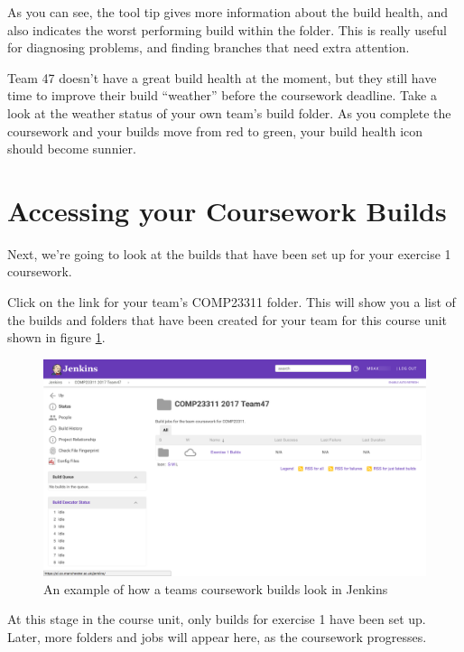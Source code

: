 \documentclass[
]{book}
\begin{document}
As you can see, the tool tip gives more information about the build health, and also indicates the worst performing build within the folder. This is really useful for diagnosing problems, and finding branches that need extra attention.

Team 47 doesn't have a great build health at the moment, but they still have time to improve their build ``weather'' before the coursework deadline. Take a look at the weather status of your own team's build folder. As you complete the coursework and your builds move from red to green, your build health icon should become sunnier.

\hypertarget{cbuilds}{%
\section{Accessing your Coursework Builds}\label{cbuilds}}

Next, we're going to look at the builds that have been set up for your exercise 1 coursework.

Click on the link for your team's COMP23311 folder. This will show you a list of the builds and folders that have been created for your team for this course unit shown in figure \ref{fig:sem1-build-jobs-fig}.

\begin{figure}

{\centering \includegraphics[width=1\linewidth]{images/sem1-build-jobs} 

}

\caption{An example of how a teams coursework builds look in Jenkins}\label{fig:sem1-build-jobs-fig}
\end{figure}

At this stage in the course unit, only builds for exercise 1 have been set up. Later, more folders and jobs will appear here, as the coursework progresses.
\end{document}
